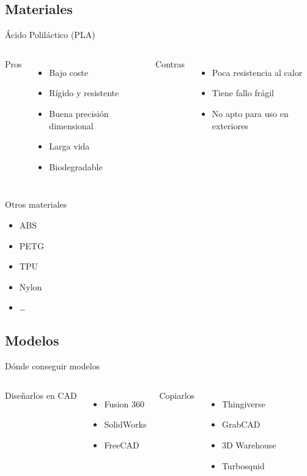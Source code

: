 \documentclass{beamer}
\begin{document}
	\subsection{Materiales}
	\begin{frame}{Ácido Poliláctico (PLA)}
		\begin{columns}[T, onlytextwidth]
			Pros
			\begin{itemize}
				\item Bajo coste
				\item Rígido y resistente
				\item Buena precisión dimensional
				\item Larga vida
				\item Biodegradable
			\end{itemize}
			Contras
			\begin{itemize}
				\item Poca resistencia al calor
				\item Tiene fallo frágil
				\item No apto para uso en exteriores
			\end{itemize}
		\end{columns}
	\end{frame}
	\begin{frame}{Otros materiales}
		\begin{itemize}
			\item ABS
			\item PETG
			\item TPU
			\item Nylon
			\item \dots
		\end{itemize}
	\end{frame}
	
	\subsection{Modelos}
	\begin{frame}{Dónde conseguir modelos}
		\begin{columns}[T, onlytextwidth]
			Diseñarlos en CAD
			\begin{itemize}
				\item Fusion 360
				\item SolidWorks
				\item FreeCAD
			\end{itemize}
			Copiarlos
			\begin{itemize}
				\item Thingiverse
				\item GrabCAD
				\item 3D Warehouse
				\item Turbosquid
			\end{itemize}
		\end{columns}
	\end{frame}
	
\end{document}
